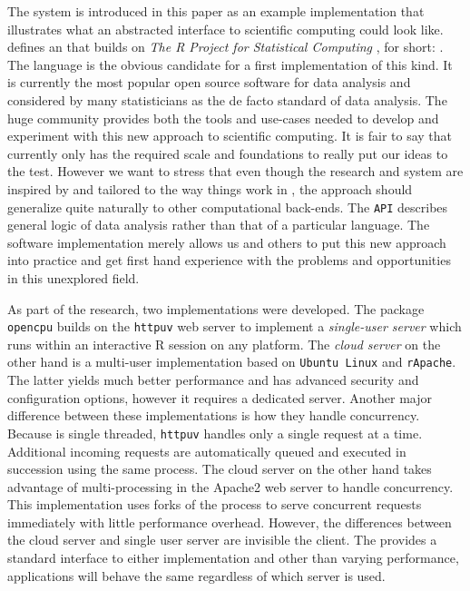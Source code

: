 The \OpenCPU system is introduced in this paper as an example implementation that illustrates what an abstracted interface to scientific computing could look like. \OpenCPU defines an \HTTP \API that builds on \emph{The R Project for Statistical Computing} \citep{R}, for short: \R. The \R language is the obvious candidate for a first implementation of this kind. It is currently the most popular open source software for data analysis and considered by many statisticians as the de facto standard of data analysis. The huge \R community provides both the tools and use-cases needed to develop and experiment with this new approach to scientific computing. It is fair to say that currently only \R has the required scale and foundations to really put our ideas to the test. However we want to stress that even though the research and \OpenCPU system are inspired by and tailored to the way things work in \R, the approach should generalize quite naturally to other computational back-ends. The \texttt{API} describes general logic of data analysis rather than that of a particular language. The software implementation merely allows us and others to put this new approach into practice and get first hand experience with the problems and opportunities in this unexplored field.

As part of the research, two \OpenCPU implementations were developed. The \R package \texttt{opencpu} builds on the \texttt{httpuv} web server \citep{httpuv} to implement a \emph{single-user server} which runs within an interactive R session on any platform. The \emph{cloud server} on the other hand is a multi-user implementation based on \texttt{Ubuntu Linux} and \texttt{rApache}. The latter yields much better performance and has advanced security and configuration options, however it requires a dedicated \Linux server. Another major difference between these implementations is how they handle concurrency. Because \R is single threaded, \texttt{httpuv} handles only a single request at a time. Additional incoming requests are automatically queued and executed in succession using the same process. The cloud server on the other hand takes advantage of multi-processing in the Apache2 web server to handle concurrency. This implementation uses forks of the \R process to serve concurrent requests immediately with little performance overhead. However, the differences between the cloud server and single user server are invisible the client. The \API provides a standard interface to either implementation and other than varying performance, applications will behave the same regardless of which server is used. 


